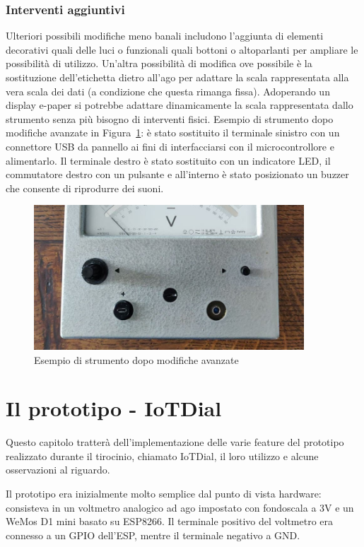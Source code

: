 \documentclass[12pt,a4paper]{report}
\begin{document}
\subsection{Interventi aggiuntivi}
Ulteriori possibili modifiche meno banali includono l'aggiunta di elementi decorativi quali delle luci o funzionali quali bottoni o altoparlanti
per ampliare le possibilità di utilizzo. Un'altra possibilità di modifica ove possibile è la sostituzione dell'etichetta dietro all'ago per adattare
la scala rappresentata alla vera scala dei dati (a condizione che questa rimanga fissa). Adoperando un display e-paper si potrebbe
adattare dinamicamente la scala rappresentata dallo strumento senza più bisogno di interventi fisici. Esempio di strumento dopo
modifiche avanzate in Figura~\ref{fig:interventocompleto}: è stato sostituito il terminale sinistro con un connettore USB da pannello
ai fini di interfacciarsi con il microcontrollore e alimentarlo. Il terminale destro è stato sostituito con un indicatore LED, il commutatore
destro con un pulsante e all'interno è stato posizionato un buzzer che consente di riprodurre dei suoni.

\begin{figure}[h]
  \centering
  \includegraphics[width=0.9\textwidth]{interventocompleto}
  \caption{Esempio di strumento dopo modifiche avanzate}
  \label{fig:interventocompleto}
\end{figure}

\chapter{Il prototipo - IoTDial}
Questo capitolo tratterà dell'implementazione delle varie feature del prototipo realizzato durante il tirocinio, chiamato IoTDial,
il loro utilizzo e alcune osservazioni al riguardo.

Il prototipo era inizialmente molto semplice dal punto di vista hardware: consisteva in un voltmetro analogico ad ago impostato con
fondoscala a 3V e un WeMos D1 mini basato su ESP8266. Il terminale positivo del voltmetro era connesso a un GPIO dell'ESP,
mentre il terminale negativo a GND.
\end{document}
